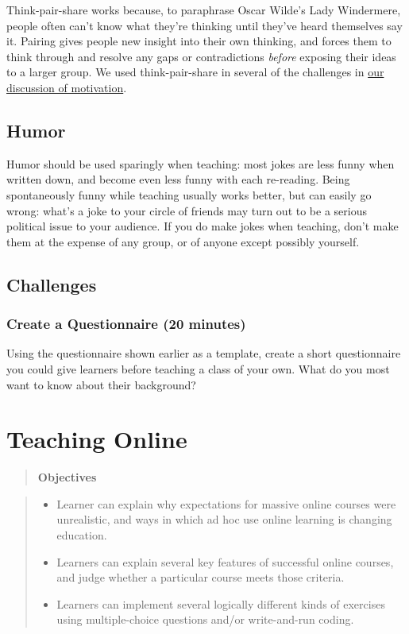 \documentclass[10pt,statementpaper]{memoir}
\providecommand{\tightlist}{%
  \setlength{\itemsep}{0pt}\setlength{\parskip}{0pt}}
\begin{document}
Think-pair-share works because, to paraphrase Oscar Wilde's Lady
Windermere, people often can't know what they're thinking until they've
heard themselves say it. Pairing gives people new insight into their own
thinking, and forces them to think through and resolve any gaps or
contradictions \emph{before} exposing their ideas to a larger group. We
used think-pair-share in several of the challenges in
\href{motivation.html\#challenges}{our discussion of motivation}.

\section{Humor}\label{humor}

Humor should be used sparingly when teaching: most jokes are less funny
when written down, and become even less funny with each re-reading.
Being spontaneously funny while teaching usually works better, but can
easily go wrong: what's a joke to your circle of friends may turn out to
be a serious political issue to your audience. If you do make jokes when
teaching, don't make them at the expense of any group, or of anyone
except possibly yourself.

\section{Challenges}\label{challenges-8}

\subsection*{Create a Questionnaire (20
minutes)}\label{create-a-questionnaire-20-minutes}

Using the questionnaire shown earlier as a template, create a short
questionnaire you could give learners before teaching a class of your
own. What do you most want to know about their background?

\chapter{Teaching Online}\label{teaching-online}

\begin{quote}
\textbf{Objectives}
\end{quote}

\begin{quote}
\begin{itemize}
\tightlist
\item
  Learner can explain why expectations for massive online courses were
  unrealistic, and ways in which ad hoc use online learning is changing
  education.
\item
  Learners can explain several key features of successful online
  courses, and judge whether a particular course meets those criteria.
\item
  Learners can implement several logically different kinds of exercises
  using multiple-choice questions and/or write-and-run coding.
\end{itemize}
\end{quote}
\end{document}
